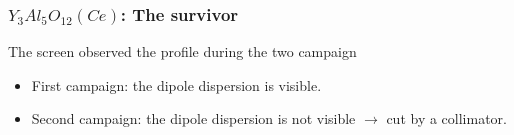 \begin{frame}[t]
  \frametitle{$Y_{3}Al_{5}O_{12}(Ce)$: The survivor}
  \begin{block}{The screen observed the profile during the two campaign}
     \begin{itemize}
       \item First campaign: the dipole dispersion is visible.
       \item Second campaign: the dipole dispersion is not visible $\rightarrow$ cut by a collimator.
     \end{itemize}
  \end{block}
  \begin{columns}[T]
    \begin{column}{0.45\textwidth}

\end{column}
\end{columns}
\end{frame}

